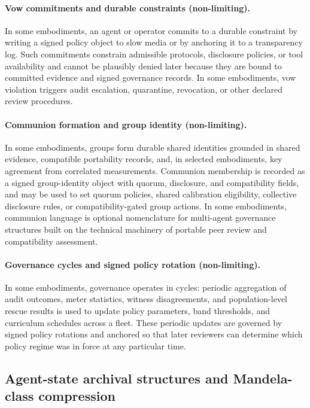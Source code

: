 \documentclass[a4paper,12pt]{article}
\begin{document}
\paragraph{Vow commitments and durable constraints (non-limiting).}

In some embodiments, an agent or operator commits to a durable
constraint by writing a signed policy object to slow media or by
anchoring it to a transparency log. Such commitments constrain
admissible protocols, disclosure policies, or tool availability and
cannot be plausibly denied later because they are bound to committed
evidence and signed governance records. In some embodiments, vow
violation triggers audit escalation, quarantine, revocation, or other
declared review procedures.

\paragraph{Communion formation and group identity (non-limiting).}

In some embodiments, groups form durable shared identities grounded in
shared evidence, compatible portability records, and, in selected
embodiments, key agreement from correlated measurements. Communion
membership is recorded as a signed group-identity object with
quorum, disclosure, and compatibility fields, and may be used to set
quorum policies, shared calibration eligibility, collective
disclosure rules, or compatibility-gated group actions. In some embodiments, communion language is optional nomenclature
for multi-agent governance structures built on the technical machinery
of portable peer review and compatibility assessment.

\paragraph{Governance cycles and signed policy rotation (non-limiting).}

In some embodiments, governance operates in cycles: periodic
aggregation of audit outcomes, meter statistics, witness disagreements,
and population-level rescue results is used to update policy
parameters, band thresholds, and curriculum schedules across a fleet.
These periodic updates are governed by signed policy rotations and
anchored so that later reviewers can determine which policy regime was
in force at any particular time.

\subsection{Agent-state archival structures and Mandela-class
  compression}
\label{sec:agent-state-archival}
\end{document}
